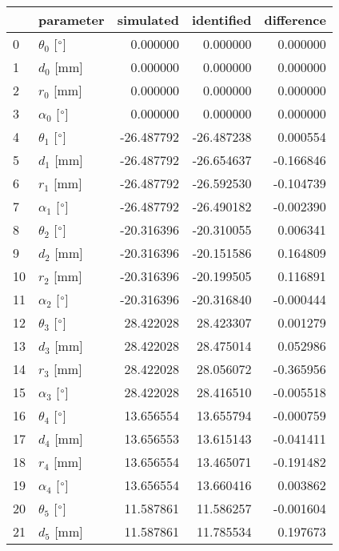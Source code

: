 \documentclass{standalone}%
\begin{document}
%
\normalsize%
\begin{tabular}{llrrr}
\toprule
{} &                 parameter &  simulated & identified & difference \\
\midrule
0  &  $\theta_{0}$ [$\degree$] &   0.000000 &   0.000000 &   0.000000 \\
1  &              $d_{0}$ [mm] &   0.000000 &   0.000000 &   0.000000 \\
2  &              $r_{0}$ [mm] &   0.000000 &   0.000000 &   0.000000 \\
3  &  $\alpha_{0}$ [$\degree$] &   0.000000 &   0.000000 &   0.000000 \\
4  &  $\theta_{1}$ [$\degree$] & -26.487792 & -26.487238 &   0.000554 \\
5  &              $d_{1}$ [mm] & -26.487792 & -26.654637 &  -0.166846 \\
6  &              $r_{1}$ [mm] & -26.487792 & -26.592530 &  -0.104739 \\
7  &  $\alpha_{1}$ [$\degree$] & -26.487792 & -26.490182 &  -0.002390 \\
8  &  $\theta_{2}$ [$\degree$] & -20.316396 & -20.310055 &   0.006341 \\
9  &              $d_{2}$ [mm] & -20.316396 & -20.151586 &   0.164809 \\
10 &              $r_{2}$ [mm] & -20.316396 & -20.199505 &   0.116891 \\
11 &  $\alpha_{2}$ [$\degree$] & -20.316396 & -20.316840 &  -0.000444 \\
12 &  $\theta_{3}$ [$\degree$] &  28.422028 &  28.423307 &   0.001279 \\
13 &              $d_{3}$ [mm] &  28.422028 &  28.475014 &   0.052986 \\
14 &              $r_{3}$ [mm] &  28.422028 &  28.056072 &  -0.365956 \\
15 &  $\alpha_{3}$ [$\degree$] &  28.422028 &  28.416510 &  -0.005518 \\
16 &  $\theta_{4}$ [$\degree$] &  13.656554 &  13.655794 &  -0.000759 \\
17 &              $d_{4}$ [mm] &  13.656553 &  13.615143 &  -0.041411 \\
18 &              $r_{4}$ [mm] &  13.656554 &  13.465071 &  -0.191482 \\
19 &  $\alpha_{4}$ [$\degree$] &  13.656554 &  13.660416 &   0.003862 \\
20 &  $\theta_{5}$ [$\degree$] &  11.587861 &  11.586257 &  -0.001604 \\
21 &              $d_{5}$ [mm] &  11.587861 &  11.785534 &   0.197673 \\

\end{tabular}
\end{document}

